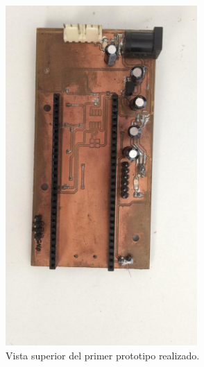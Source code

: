 \begin{figure}[!htbp]
	\centering
	\includegraphics[angle = 90, width=0.65\textwidth]{./Figures/prototipo11.jpeg}		
	\caption{Vista superior del primer prototipo realizado.}
	\label{fig:prototipo1sup}
\end{figure}


